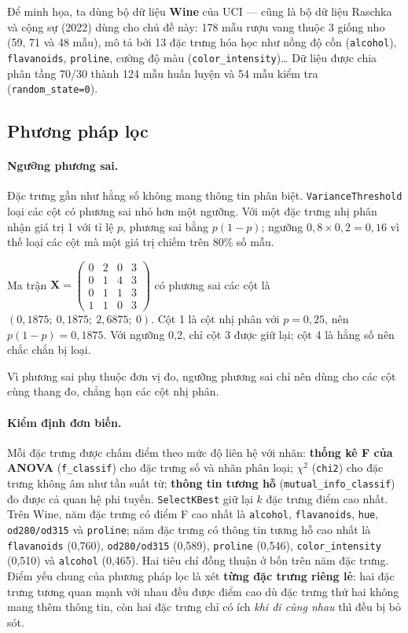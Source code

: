Để minh họa, ta dùng bộ dữ liệu \textbf{Wine} của UCI --- cũng là bộ dữ liệu Raschka và cộng sự (2022) dùng cho chủ đề này: 178 mẫu rượu vang thuộc 3 giống nho (59, 71 và 48 mẫu), mô tả bởi 13 đặc trưng hóa học như nồng độ cồn (\texttt{alcohol}), \texttt{flavanoids}, \texttt{proline}, cường độ màu (\texttt{color\_intensity})\ldots{} Dữ liệu được chia phân tầng 70/30 thành 124 mẫu huấn luyện và 54 mẫu kiểm tra (\texttt{random\_state=0}).

\subsection{Phương pháp lọc}

\paragraph{Ngưỡng phương sai.} Đặc trưng gần như hằng số không mang thông tin phân biệt. \texttt{VarianceThreshold} loại các cột có phương sai nhỏ hơn một ngưỡng. Với một đặc trưng nhị phân nhận giá trị 1 với tỉ lệ $p$, phương sai bằng $p(1 - p)$; ngưỡng $0{,}8 \times 0{,}2 = 0{,}16$ vì thế loại các cột mà một giá trị chiếm trên 80\% số mẫu.

\begin{example}
Ma trận $\mathbf{X} = \begin{pmatrix} 0 & 2 & 0 & 3 \\ 0 & 1 & 4 & 3 \\ 0 & 1 & 1 & 3 \\ 1 & 1 & 0 & 3 \end{pmatrix}$ có phương sai các cột là $(0{,}1875;\ 0{,}1875;\ 2{,}6875;\ 0)$. Cột 1 là cột nhị phân với $p = 0{,}25$, nên $p(1 - p) = 0{,}1875$. Với ngưỡng 0,2, chỉ cột 3 được giữ lại; cột 4 là hằng số nên chắc chắn bị loại.
\end{example}

\noindent Vì phương sai phụ thuộc đơn vị đo, ngưỡng phương sai chỉ nên dùng cho các cột cùng thang đo, chẳng hạn các cột nhị phân.

\paragraph{Kiểm định đơn biến.} Mỗi đặc trưng được chấm điểm theo mức độ liên hệ với nhãn: \textbf{thống kê F của ANOVA} (\texttt{f\_classif}) cho đặc trưng số và nhãn phân loại; \textbf{$\chi^2$} (\texttt{chi2}) cho đặc trưng không âm như tần suất từ; \textbf{thông tin tương hỗ} (\texttt{mutual\_info\_classif}) đo được cả quan hệ phi tuyến. \texttt{SelectKBest} giữ lại $k$ đặc trưng điểm cao nhất. Trên Wine, năm đặc trưng có điểm F cao nhất là \texttt{alcohol}, \texttt{flavanoids}, \texttt{hue}, \texttt{od280/od315} và \texttt{proline}; năm đặc trưng có thông tin tương hỗ cao nhất là \texttt{flavanoids} (0,760), \texttt{od280/od315} (0,589), \texttt{proline} (0,546), \texttt{color\_intensity} (0,510) và \texttt{alcohol} (0,465). Hai tiêu chí đồng thuận ở bốn trên năm đặc trưng. Điểm yếu chung của phương pháp lọc là xét \textbf{từng đặc trưng riêng lẻ}: hai đặc trưng tương quan mạnh với nhau đều được điểm cao dù đặc trưng thứ hai không mang thêm thông tin, còn hai đặc trưng chỉ có ích \textit{khi đi cùng nhau} thì đều bị bỏ sót.

